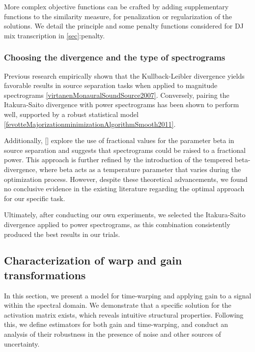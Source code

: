 More complex objective functions can be crafted by adding supplementary
functions to the similarity measure, for penalization or regularization
of the solutions. We detail the principle and some penalty functions
considered for DJ mix transcription in
\hyperref[sec]{{[}sec{]}}:penalty.

\subsubsection{Choosing the divergence and the type of spectrograms}

Previous research empirically shown that the Kullback-Leibler divergence
yields favorable results in source separation tasks when applied to
magnitude spectrograms
\hyperref[virtanenMonauralSoundSource2007]{{[}virtanenMonauralSoundSource2007{]}}.
Conversely, pairing the Itakura-Saito divergence with power spectrograms
has been shown to perform well, supported by a robust statistical model
\hyperref[fevotteMajorizationminimizationAlgorithmSmooth2011]{{[}fevotteMajorizationminimizationAlgorithmSmooth2011{]}}.

Additionally, {[}{]} explore the use of fractional values for the
parameter beta in source separation and suggests that spectrograms could
be raised to a fractional power. This approach is further refined by the
introduction of the tempered beta-divergence, where beta acts as a
temperature parameter that varies during the optimization process.
However, despite these theoretical advancements, we found no conclusive
evidence in the existing literature regarding the optimal approach for
our specific task.

Ultimately, after conducting our own experiments, we selected the
Itakura-Saito divergence applied to power spectrograms, as this
combination consistently produced the best results in our trials.

\subsection{Characterization of warp and gain transformations}

In this section, we present a model for time-warping and applying gain
to a signal within the spectral domain. We demonstrate that a specific
solution for the activation matrix exists, which reveals intuitive
structural properties. Following this, we define estimators for both
gain and time-warping, and conduct an analysis of their robustness in
the presence of noise and other sources of uncertainty.


